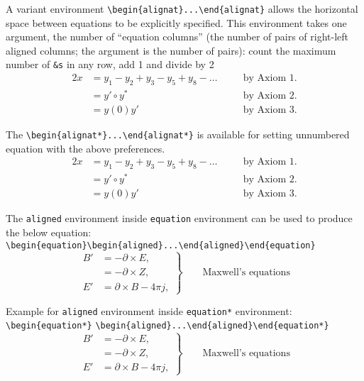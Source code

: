 \documentclass[numbers,webpdf,imaiai]{ima-authoring-template}%
\theoremstyle{thmstyleone}%
\theoremstyle{thmstyletwo}%
\theoremstyle{thmstylethree}%
\numberwithin{equation}{section}
\begin{document}
A variant environment \verb+\begin{alignat}...\end{alignat}+ allows the horizontal space between equations
to be explicitly specified. This environment takes one argument, the number of ``equation columns'' (the number of
pairs of right-left aligned columns; the argument is the number of pairs): count the maximum number of \verb+&s+ in any row,
add 1 and divide by 2
\begin{alignat}{2}
x &= y_1 - y_2 + y_3 - y_5 + y_8 - \dots  &\quad &\text{by Axiom 1.} \nonumber \\
  &= y' \circ y^{*} &\quad &\text{by Axiom 2.} \nonumber\\
  &= y(0) y' &\quad &\text{by Axiom 3.}
\end{alignat}

The \verb+\begin{alignat*}...\end{alignat*}+ is available for setting unnumbered equation
with the above preferences.
\begin{alignat*}{2}
x &= y_1 - y_2 + y_3 - y_5 + y_8 - \dots  &\quad &\text{by Axiom 1.} \\
  &= y' \circ y^{*} & &\text{by Axiom 2.} \\
  &= y(0) y' & &\text{by Axiom 3.}
\end{alignat*}

The \verb+aligned+ environment inside \verb+equation+ environment can be used to produce the below
equation: \verb+\begin{equation}\begin{aligned}...\end{aligned}\end{equation}+
\begin{equation}
\left.\begin{aligned}
B' &= -\partial\times E,\\
   &= -\partial\times Z,\\
E' &= \partial\times B - 4\pi j,
\end{aligned}\right\} \qquad \text{Maxwell's equations}
\end{equation}

Example for \verb+aligned+ environment inside \verb+equation*+ environment:
\verb+\begin{equation*}+ \verb+\begin{aligned}...\end{aligned}\end{equation*}+
\begin{equation*}
\left.\begin{aligned}
B' &= -\partial\times E,\\
   &= -\partial\times Z,\\
E' &= \partial\times B - 4\pi j,
\end{aligned}\right\} \qquad \text{Maxwell's equations}
\end{equation*}
\end{document}
